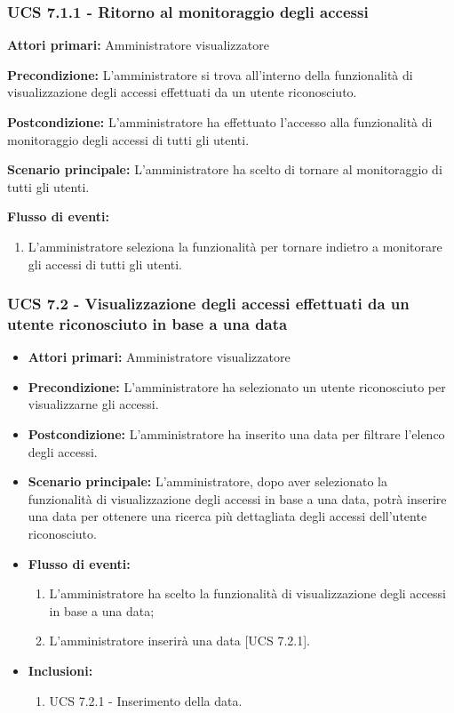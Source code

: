 \subsubsection{UCS 7.1.1 - Ritorno al monitoraggio degli accessi}
	\item \textbf{Attori primari:} Amministratore visualizzatore
	\item \textbf{Precondizione:} L'amministratore si trova all'interno della funzionalità di visualizzazione degli accessi effettuati da un utente riconosciuto.
	\item \textbf{Postcondizione:} L'amministratore ha effettuato l'accesso alla funzionalità di monitoraggio degli accessi di tutti gli utenti.
	\item \textbf{Scenario principale:} L'amministratore ha scelto di tornare al monitoraggio di tutti gli utenti.
	\item \textbf{Flusso di eventi:}
    \begin{enumerate}
        \item  L'amministratore seleziona la funzionalità per tornare indietro a monitorare gli accessi di tutti gli utenti.
    \end{enumerate}


\subsubsection{UCS 7.2 - Visualizzazione degli accessi effettuati da un utente riconosciuto in base a una data}
\begin{itemize}
	\item \textbf{Attori primari:} Amministratore visualizzatore
	\item \textbf{Precondizione:} L'amministratore ha selezionato un utente riconosciuto per visualizzarne gli accessi.
	\item \textbf{Postcondizione:} L'amministratore ha inserito una data per filtrare l'elenco degli accessi.
	\item \textbf{Scenario principale:} L'amministratore, dopo aver selezionato la funzionalità di visualizzazione degli accessi in base a una data, potrà inserire una data per ottenere una ricerca più dettagliata degli accessi dell'utente riconosciuto.
	\item \textbf{Flusso di eventi:} 
	\begin{enumerate}
		\item L'amministratore ha scelto la funzionalità di visualizzazione degli accessi in base a una data;
		\item L'amministratore inserirà una data [UCS 7.2.1].
	\end{enumerate}
	\item \textbf{Inclusioni:}
	\begin{enumerate}
		\item UCS 7.2.1 - Inserimento della data.
	\end{enumerate}
\end{itemize}

